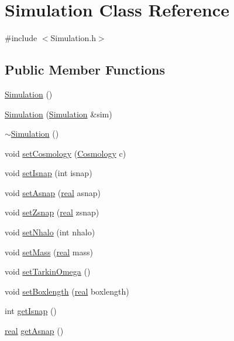 \section{Simulation Class Reference}
\label{classSimulation}


{\ttfamily \#include $<$Simulation.h$>$}

\subsection*{Public Member Functions}
\begin{DoxyCompactItemize}
\item 
\hyperlink{classSimulation_a5b224cc5b36bcc8eb29689aff223de41}{Simulation} ()
\item 
\hyperlink{classSimulation_ac323b9845f7fe2ad84a61ad48bfec710}{Simulation} (\hyperlink{classSimulation}{Simulation} \&sim)
\item 
\hyperlink{classSimulation_a80fad3f57dfaf195a36f7bc49bc88279}{$\sim$Simulation} ()
\item 
void \hyperlink{classSimulation_a79be25490771dcf373cce8760d2e6e72}{setCosmology} (\hyperlink{classCosmology}{Cosmology} c)
\item 
void \hyperlink{classSimulation_a76edc37c249af029304892640ca1b9f7}{setIsnap} (int isnap)
\item 
void \hyperlink{classSimulation_a371b8a6dd17e18ed451172dc0b0229c1}{setAsnap} (\hyperlink{Global_8h_a031f8951175b43076c2084a6c2173410}{real} asnap)
\item 
void \hyperlink{classSimulation_a6cd5d9b2efc9be5af7119ab78d0b033b}{setZsnap} (\hyperlink{Global_8h_a031f8951175b43076c2084a6c2173410}{real} zsnap)
\item 
void \hyperlink{classSimulation_a3ba01b322f66c0c31e5e2868c6e9d87a}{setNhalo} (int nhalo)
\item 
void \hyperlink{classSimulation_a315d0faa24c9893d4fef8f50ed0e714a}{setMass} (\hyperlink{Global_8h_a031f8951175b43076c2084a6c2173410}{real} mass)
\item 
void \hyperlink{classSimulation_a20bb9b13e7882a76fac7009cc848ed9a}{setTarkinOmega} ()
\item 
void \hyperlink{classSimulation_a40a299a42e925403ef5f3ee91421648d}{setBoxlength} (\hyperlink{Global_8h_a031f8951175b43076c2084a6c2173410}{real} boxlength)
\item 
int \hyperlink{classSimulation_a9fc3c5cd3b5b71c868355b355128b01b}{getIsnap} ()
\item 
\hyperlink{Global_8h_a031f8951175b43076c2084a6c2173410}{real} \hyperlink{classSimulation_a03369208e6eeb8e4bacc778c1f23c299}{getAsnap} ()

\end{DoxyCompactItemize}
